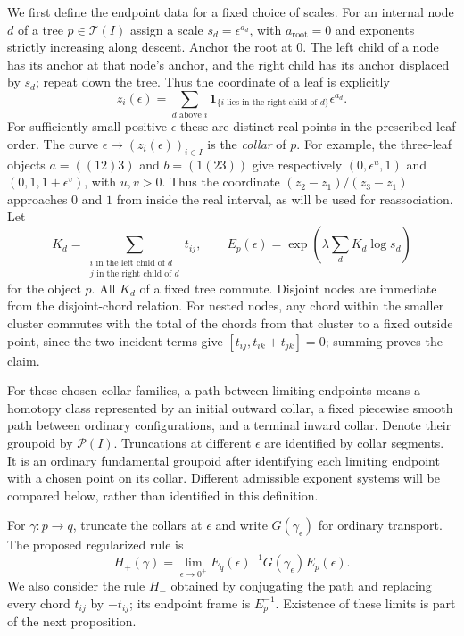 \documentclass[11pt]{article}
\theoremstyle{definition}
\theoremstyle{remark}
\numberwithin{equation}{section}
\begin{document}
We first define the endpoint data for a fixed choice of scales.
For an internal node $d$ of a tree $p\in\mathcal T(I)$ assign a scale
$s_d=\epsilon^{a_d}$, with $a_{\mathrm{root}}=0$ and exponents strictly
increasing along descent.  Anchor the root at $0$.  The left child of a
node has its anchor at that node's anchor, and the right child has its
anchor displaced by $s_d$; repeat down the tree.  Thus the coordinate
of a leaf is explicitly
\begin{equation}\label{eq:holonomy-tree-coordinate}
 z_i(\epsilon)=
 \sum_{d\text{ above }i}
 \mathbf1_{\{i\text{ lies in the right child of }d\}}\epsilon^{a_d}.
\end{equation}
For sufficiently small positive $\epsilon$ these are distinct real
points in the prescribed leaf order.  The curve
$\epsilon\mapsto(z_i(\epsilon))_{i\in I}$ is the \emph{collar} of $p$.
For example, the three-leaf
objects $a=((12)3)$ and $b=(1(23))$ give respectively
$(0,\epsilon^u,1)$ and $(0,1,1+\epsilon^v)$, with $u,v>0$.
Thus the coordinate $(z_2-z_1)/(z_3-z_1)$ approaches $0$ and $1$
from inside the real interval, as will be used for reassociation.
Let
\[
 K_d=\sum_{\substack{i\text{ in the left child of }d\\
              j\text{ in the right child of }d}}t_{ij},
 \qquad
 E_p(\epsilon)=
 \exp\left(\lambda\sum_dK_d\log s_d\right)
\]
for the object $p$.  All $K_d$ of a fixed tree commute.  Disjoint nodes
are immediate from the disjoint-chord relation.  For nested nodes,
any chord within the smaller cluster commutes with the total of the
chords from that cluster to a fixed outside point, since the two
incident terms give $[t_{ij},t_{ik}+t_{jk}]=0$; summing proves the
claim.

For these chosen collar families, a path between limiting endpoints
means a homotopy class represented by an initial outward collar, a
fixed piecewise smooth path between ordinary configurations, and a
terminal inward collar.  Denote their groupoid by $\mathcal P(I)$.
Truncations at different $\epsilon$ are identified by collar segments.
It is an ordinary fundamental groupoid after identifying each limiting
endpoint with a chosen point on its collar.  Different admissible
exponent systems will be compared below, rather than identified in
this definition.

For $\gamma:p\longrightarrow q$, truncate the collars at $\epsilon$
and write $G(\gamma_\epsilon)$ for ordinary transport.  The proposed
regularized rule is
\begin{equation}\label{eq:holonomy-regularized}
 H_+(\gamma)=\lim_{\epsilon\to0^+}
 E_q(\epsilon)^{-1}G(\gamma_\epsilon)E_p(\epsilon).
\end{equation}
We also consider the rule $H_-$ obtained by conjugating the path and
replacing every chord $t_{ij}$ by $-t_{ij}$; its endpoint frame is
$E_p^{-1}$.  Existence of these limits is part of the next proposition.
\end{document}
